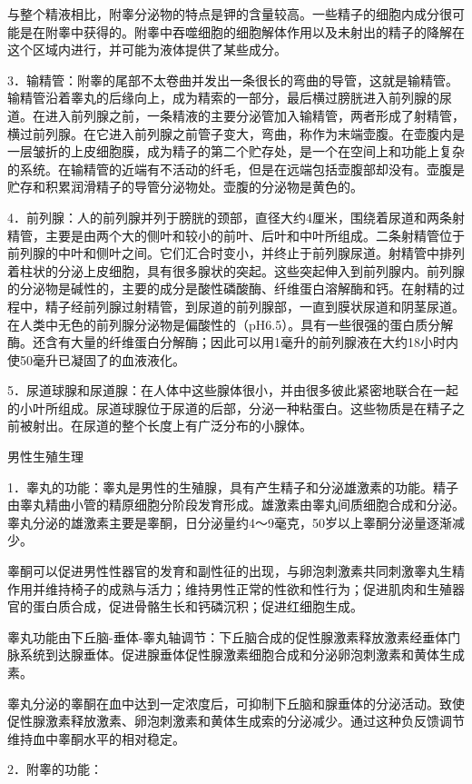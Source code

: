 \documentclass[12pt,UTF8]{ctexbook}
\begin{document}
与整个精液相比，附睾分泌物的特点是钾的含量较高。一些精子的细胞内成分很可能是在附睾中获得的。附睾中吞噬细胞的细胞解体作用以及未射出的精子的降解在这个区域内进行，并可能为液体提供了某些成分。

3．输精管：附睾的尾部不太卷曲并发出一条很长的弯曲的导管，这就是输精管。输精管沿着睾丸的后缘向上，成为精索的一部分，最后横过膀胱进入前列腺的尿道。在进入前列腺之前，一条精液的主要分泌管加入输精管，两者形成了射精管，横过前列腺。在它进入前列腺之前管子变大，弯曲，称作为末端壶腹。在壶腹内是一层皱折的上皮细胞膜，成为精子的第二个贮存处，是一个在空间上和功能上复杂的系统。在输精管的近端有不活动的纤毛，但是在远端包括壶腹部却没有。壶腹是贮存和积累润滑精子的导管分泌物处。壶腹的分泌物是黄色的。

4．前列腺：人的前列腺并列于膀胱的颈部，直径大约4厘米，围绕着尿道和两条射精管，主要是由两个大的侧叶和较小的前叶、后叶和中叶所组成。二条射精管位于前列腺的中叶和侧叶之间。它们汇合时变小，并终止于前列腺尿道。射精管中排列着柱状的分泌上皮细胞，具有很多腺状的突起。这些突起伸入到前列腺内。前列腺的分泌物是碱性的，主要的成分是酸性磷酸酶、纤维蛋白溶解酶和钙。在射精的过程中，精子经前列腺过射精管，到尿道的前列腺部，一直到膜状尿道和阴茎尿道。在人类中无色的前列腺分泌物是偏酸性的（pH6.5）。具有一些很强的蛋白质分解酶。还含有大量的纤维蛋白分解酶；因此可以用1毫升的前列腺液在大约18小时内使50毫升已凝固了的血液液化。

5．尿道球腺和尿道腺：在人体中这些腺体很小，并由很多彼此紧密地联合在一起的小叶所组成。尿道球腺位于尿道的后部，分泌一种粘蛋白。这些物质是在精子之前被射出。在尿道的整个长度上有广泛分布的小腺体。

男性生殖生理

1．睾丸的功能：睾丸是男性的生殖腺，具有产生精子和分泌雄激素的功能。精子由睾丸精曲小管的精原细胞分阶段发育形成。雄激素由睾丸间质细胞合成和分泌。睾丸分泌的雄激素主要是睾酮，日分泌量约4～9毫克，50岁以上睾酮分泌量逐渐减少。

睾酮可以促进男性性器官的发育和副性征的出现，与卵泡刺激素共同刺激睾丸生精作用并维持椅子的成熟与活力；维持男性正常的性欲和性行为；促进肌肉和生殖器官的蛋白质合成，促进骨骼生长和钙磷沉积；促进红细胞生成。

睾丸功能由下丘脑-垂体-睾丸轴调节：下丘脑合成的促性腺激素释放激素经垂体门脉系统到达腺垂体。促进腺垂体促性腺激素细胞合成和分泌卵泡刺激素和黄体生成素。

睾丸分泌的睾酮在血中达到一定浓度后，可抑制下丘脑和腺垂体的分泌活动。致使促性腺激素释放激素、卵泡刺激素和黄体生成索的分泌减少。通过这种负反馈调节维持血中睾酮水平的相对稳定。

2．附睾的功能：
\end{document}
